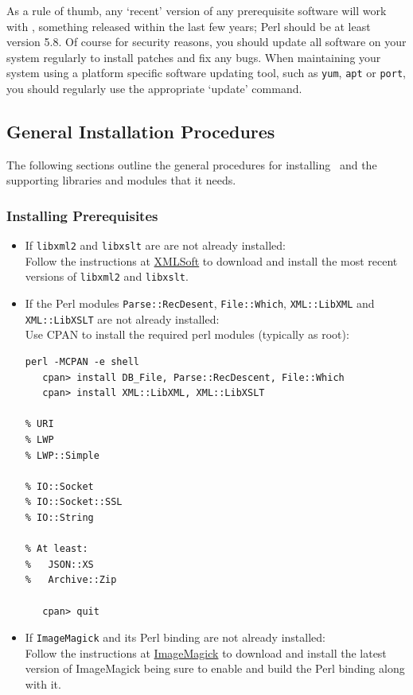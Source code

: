 \documentclass{article}
\begin{document}
As a rule of thumb, any `recent' version of any prerequisite software will
work with \LaTeXML, something released within the last few years;
Perl should be at least version 5.8.
Of course for security reasons, you should update all software on your system
regularly to install patches and fix any bugs.
When maintaining your system using a platform specific software
updating tool, such as \texttt{yum}, \texttt{apt} or \texttt{port},
you should regularly use the appropriate `update' command.

\subsection{General Installation Procedures}\label{install.general}
The following sections outline the general procedures for installing
\LaTeXML\ and the supporting libraries and modules that it needs.

\subsubsection{Installing Prerequisites}\label{install.prerequisites}
\begin{itemize}
\item If \texttt{libxml2} and \texttt{libxslt} are are not already installed:\\
  Follow the instructions at \href{http://www.xmlsoft.org}{XMLSoft} to
  download and install the most recent versions of \texttt{libxml2} and \texttt{libxslt}.
\item If the Perl modules \texttt{Parse::RecDesent}, \texttt{File::Which},
  \texttt{XML::LibXML} and  \texttt{XML::LibXSLT} are not already installed:\\
 Use CPAN to install the required perl modules (typically as root):
\begin{lstlisting}[style=shell]
   perl -MCPAN -e shell
   cpan> install DB_File, Parse::RecDescent, File::Which
   cpan> install XML::LibXML, XML::LibXSLT

% URI
% LWP
% LWP::Simple

% IO::Socket
% IO::Socket::SSL
% IO::String

% At least:
%   JSON::XS
%   Archive::Zip

   cpan> quit
\end{lstlisting}
\item If \texttt{ImageMagick} and its Perl binding are not already installed:\\
  Follow the instructions at \href{http://www.imagemagick.org/}{ImageMagick}
  to download and install the latest version of ImageMagick being sure to enable
  and build the Perl binding along with it.
\end{itemize}
\end{document}
